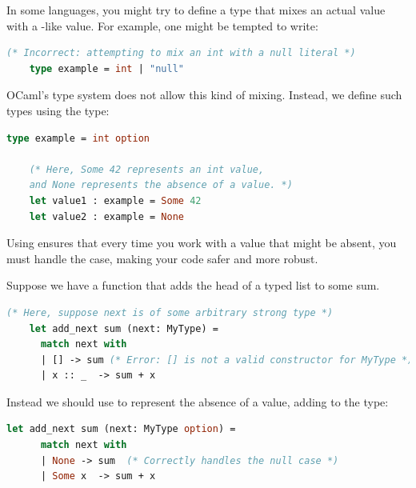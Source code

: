 \vspace{2em}

\begin{Example}

In some languages, you might try to define a type that mixes an actual value with a -like value. For example, one might be tempted to write:

\begin{lstlisting}[language=OCaml, caption={Incorrect Approach with a "Null" Value}, numbers=none]
    (* Incorrect: attempting to mix an int with a null literal *)
    type example = int | "null"
\end{lstlisting}

\noindent
OCaml's type system does not allow this kind of mixing. Instead, we define such types using the  type:

\begin{lstlisting}[language=OCaml, caption={Correct Approach Using Option}, numbers=none]
    type example = int option

    (* Here, Some 42 represents an int value,
    and None represents the absence of a value. *)
    let value1 : example = Some 42
    let value2 : example = None
\end{lstlisting}

Using  ensures that every time you work with a value that might be absent, you must handle the  case, making your code safer and more robust.
\end{Example}

\begin{Example}

    Suppose we have a function that adds the head of a typed list to some sum.
    
    \begin{lstlisting}[language=OCaml, caption={Incorrect Approach for Null case}, numbers=none]
    (* Here, suppose next is of some arbitrary strong type *)
    let add_next sum (next: MyType) =
      match next with
      | [] -> sum (* Error: [] is not a valid constructor for MyType *)
      | x :: _  -> sum + x
    \end{lstlisting}
    
    \noindent
    Instead we should use  to represent the absence of a value, adding  to the type:
    
    \begin{lstlisting}[language=OCaml, caption={Correct: Using None for an Option}, numbers=none]
    let add_next sum (next: MyType option) =
      match next with
      | None -> sum  (* Correctly handles the null case *)
      | Some x  -> sum + x
    \end{lstlisting}

\end{Example}
    
